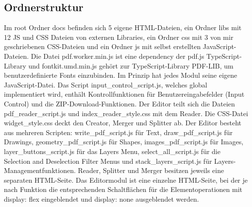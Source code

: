 \subsection{Ordnerstruktur}
Im root Ordner docs befinden sich 5 eigene HTML-Dateien, ein Ordner libs mit 12 JS und CSS Dateien von externen Libraries, ein Ordner css mit 3 von mir geschriebenen CSS-Dateien und ein Ordner js mit selbst erstellten JavaScript-Dateien. Die Datei pdf.worker.min.js ist eine dependency der pdf.js TypeScript-Library und fontkit.umd.min.js gehört zur TypeScript-Library PDF-LIB, um benutzerdefinierte Fonts einzubinden. Im Prinzip hat jedes Modul seine eigene JavaScript-Datei. Das Script input\_control\_script.js, welches global implementiert wird, enthält Kontrollfunktionen für Benutzereingabefelder (Input Control) und die ZIP-Download-Funktionen. Der Editor teilt sich die Dateien pdf\_reader\_script.js und index\_reader\_style.css mit dem Reader. Die CSS-Datei widget\_style.css deckt den Creator, Merger und Splitter ab. Der Editor besteht aus mehreren Scripten: write\_pdf\_script.js für Text, draw\_pdf\_script.js für Drawings, geometry\_pdf\_script.js für Shapes, images\_pdf\_script.js für Images, layer\_buttons\_script.js für das Layers Menu, select\_all\_script.js für die Selection and Deselection Filter Menus und stack\_layers\_script.js für Layers-Managementfunktionen. Reader, Splitter und Merger besitzen jeweils eine separaten HTML-Seite. Das Editormodul ist eine einzelne HTML-Seite, bei der je nach Funktion die entsprechenden Schaltflächen für die Elementoperationen mit display: flex eingeblendet und display: none ausgeblendet werden. 

